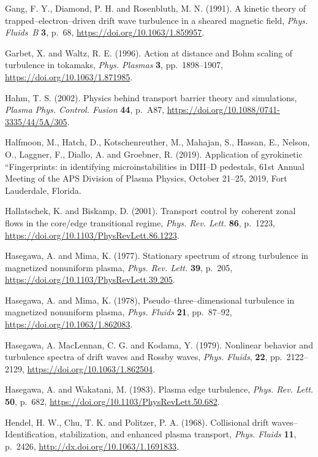 \documentclass[a4paper,openany,12pt]{book}
\begin{document}
{\begin{thebibliography}{100}
\bibitem{}
Gang, F. Y., Diamond, P. H. and Rosenbluth, M. N. (1991).
A kinetic theory of trapped--electron--driven drift wave turbulence in a sheared magnetic field, {\em Phys. Fluids~B} \textbf{3}, p.~68, \url{https://doi.org/10.1063/1.859957}.

\bibitem{}
Garbet, X. and Waltz, R. E. (1996). Action at distance and Bohm scaling of turbulence in tokamaks, \emph{Phys. Plasmas} \textbf{3}, pp.~1898--1907, \url{https://doi.org/10.1063/1.871985}.

\bibitem{}
Hahm, T. S. (2002). Physics behind transport barrier theory and simulations, {\em Plasma Phys. Control. Fusion} \textbf{44}, p.~A87, \url{https://doi.org/10.1088/0741-3335/44/5A/305}.

\bibitem{}
Halfmoon, M., Hatch, D., Kotschenreuther, M., Mahajan, S., Hassan, E., Nelson, O., Laggner, F., Diallo, A. and Groebner, R. (2019). Application of gyrokinetic ``Fingerprints: in identifying microinstabilities in DIII--D pedestals, 61st Annual Meeting of the APS Division of Plasma Physics, October 21--25, 2019, Fort Lauderdale, Florida.

\bibitem{}
Hallatschek, K. and Biskamp, D. (2001). Transport control by coherent zonal flows in the core/edge transitional regime, \emph{Phys. Rev. Lett.} \textbf{86}, p.~1223, \url{https://doi.org/10.1103/PhysRevLett.86.1223}.

\bibitem{}
Hasegawa, A. and Mima, K. (1977). Stationary spectrum of strong turbulence in magnetized nonuniform plasma, \emph{Phys. Rev. Lett.} \textbf{39}, p.~205, \url{https://doi.org/10.1103/PhysRevLett.39.205}. 

\bibitem{}
Hasegawa, A. and Mima, K. (1978), Pseudo--three--dimensional turbulence in magnetized nonuniform plasma, 
\emph{Phys. Fluids} \textbf{21}, pp.~87--92, \url{https://doi.org/10.1063/1.862083}.

\bibitem{}
Hasegawa, A. MacLennan, C. G. and Kodama, Y. (1979). Nonlinear behavior and turbulence spectra of drift waves and Rossby waves, \emph{Phys. Fluids}, \textbf{22}, pp.~2122--2129, \url{https://doi.org/10.1063/1.862504}.

\bibitem{}
Hasegawa, A. and Wakatani, M. (1983). Plasma edge turbulence, \emph{Phys. Rev. Lett.} \textbf{50}, p.~682, 
\url{https://doi.org/10.1103/PhysRevLett.50.682}.

\bibitem{}
Hendel, H. W., Chu, T. K. and Politzer, P. A. (1968). Collisional drift waves--Identification, stabilization, and enhanced plasma transport, \emph{Phys. Fluids} {\bf11}, p.~2426, \url{http://dx.doi.org/10.1063/1.1691833}.


\end{thebibliography}}
\end{document}
